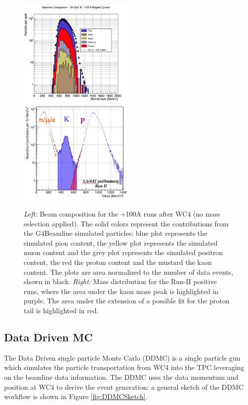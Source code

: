 \begin{figure}
\includegraphics[width=0.5\textwidth,height=\textheight,keepaspectratio]{Chapter-5/Images/Beam100Pos.png}
\includegraphics[width=0.5\textwidth,height=\textheight,keepaspectratio]{Chapter-5/Images/MassPos.png}
\caption{\emph{Left:} Beam composition for the +100A runs after WC4 (no mass selection applied). The solid colors represent the contributions from the G4Beamline simulated particles: blue plot represents the simulated pion content, the yellow plot represents the simulated muon content and the grey plot represents the simulated positron content, the red the proton content and the mustard the kaon content. The plots are area normalized to the number of data events, shown in black. \emph{Right:} Mass distribution for the Run-II positive runs, where the area under the kaon mass peak is highlighted in purple. The area under the extension of a possible fit for the proton tail is highlighted in red. }
\label{fig:BeamCompositionPos}
\end{figure}



\subsection{Data Driven MC}\label{sec:DDMC}
The Data Driven single particle Monte Carlo (DDMC) is a single particle gun which simulates the particle transportation from WC4 into the TPC leveraging on the beamline data information. The DDMC uses the data momentum and position at WC4 to derive the event generation: a general sketch of the DDMC workflow is shown in Figure \ref{fig:DDMCSketch}.

